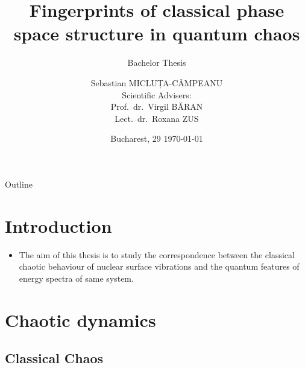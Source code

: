 \documentclass[a4,compress]{beamer}
\title[Fingerprints of classical structures in quantum chaos]{Fingerprints of classical phase space structure in quantum chaos}
\subtitle{Bachelor Thesis}
\author{
  Sebastian MICLUȚA-CÂMPEANU \\
  \hspace{6cm} {\small	Scientific Advisers:} \\
  \hspace{6.35cm} {\small Prof.~dr.~Virgil BĂRAN} \\
  \hspace{6.35cm} {\small Lect.~dr.~Roxana ZUS}
}
\institute[Universitatea din București]
{
  Universitatea din București \\
  Facultatea de Fizică
}
\date{\small Bucharest, 29 \printdayoff\today}
\begin{document}

\begin{frame}[plain]
 \titlepage
\end{frame}



\begin{frame}{Outline}
  \tableofcontents[]%
\end{frame}

\section[Intro]{Introduction}


\begin{frame}
  \begin{itemize}
    \item The aim of this thesis is to study the correspondence
    between the classical chaotic behaviour of nuclear surface vibrations
    and the quantum features of energy spectra of same system.
  \end{itemize}
\end{frame}

\section[Chaos]{Chaotic dynamics}

\subsection{Classical Chaos}


\end{document}
